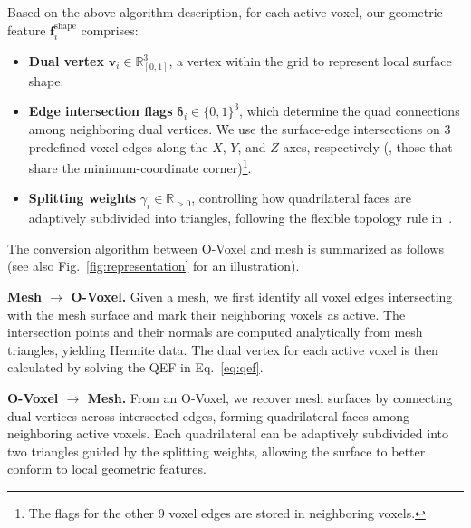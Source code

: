 \documentclass[10pt,twocolumn,letterpaper]{article}
\begin{document}
Based on the above algorithm description, for each active voxel, our geometric feature $\boldsymbol{f}^{\text{shape}}_i$ comprises:
\begin{itemize}[leftmargin=1em]
	\item \textbf{Dual vertex} $\boldsymbol{v}_i \in \mathbb{R}_{[0,1]}^3$, a vertex within the grid to represent  local surface shape.
	\item \textbf{Edge intersection flags} $\boldsymbol{\delta}_i \in \{0,1\}^3$, which determine the quad connections among neighboring dual vertices. We use the surface-edge intersections on 3 predefined voxel edges along the $X$, $Y$, and $Z$ axes, respectively (\eg, those that share the minimum-coordinate corner)\footnote{The flags for the other 9 voxel edges are stored in neighboring voxels.}.
	\item \textbf{Splitting weights} $\gamma_i \in \mathbb{R}_{>0}$, controlling how quadrilateral faces are adaptively subdivided into triangles, following the flexible topology rule in~\cite{shen2023flexicubes}.
\end{itemize}
The conversion algorithm between O-Voxel and mesh is summarized as follows (see also Fig.~\ref{fig:representation} for an illustration).


\textbf{Mesh $\rightarrow$ O-Voxel.}
Given a mesh, we first identify all voxel edges intersecting with the mesh surface and mark their neighboring voxels as active. 
The intersection points and their normals are computed analytically from mesh triangles, yielding Hermite data. The dual vertex for each active voxel is then calculated by solving the QEF in Eq.~\eqref{eq:qef}.

\textbf{O-Voxel $\rightarrow$ Mesh.}
From an O-Voxel, we recover mesh surfaces by connecting dual vertices across intersected edges, forming quadrilateral faces among neighboring active voxels. 
Each quadrilateral can be adaptively subdivided into two triangles guided by the splitting weights, allowing the surface to better conform to local geometric features. 
\end{document}
